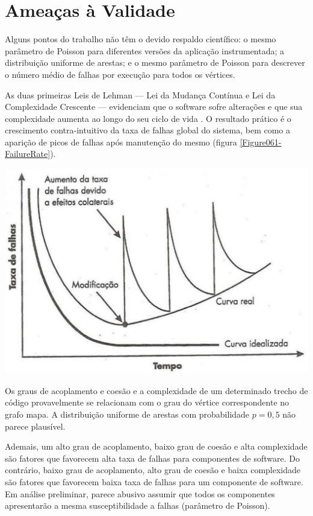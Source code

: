 
\section{Ameaças à Validade}

Alguns pontos do trabalho não têm o devido respaldo científico: o mesmo
parâmetro de Poisson para diferentes versões da aplicação instrumentada; a
distribuição uniforme de arestas; e o mesmo parâmetro de Poisson para descrever
o número médio de falhas por execução para todos os vértices.

As duas primeiras Leis de Lehman --- Lei da Mudança Contínua e Lei da
Complexidade Crescente --- evidenciam que o software sofre alterações e que sua
complexidade aumenta ao longo do seu ciclo de vida \cite{Wazlawick2013}. O
resultado prático é o crescimento contra-intuitivo da taxa de falhas global do
sistema, bem como a aparição de picos de falhas após manutenção do mesmo
(figura \ref{Figure061-FailureRate}).

\hfill \break
{
  \centering
  \captionsetup{type=figure}
	\includegraphics[scale=0.1625]{./figures/Figure061-FailureRate.pdf}
  \hfill
	\label{Figure061-FailureRate}
}

Os graus de acoplamento e coesão e a complexidade de um determinado trecho de
código provavelmente se relacionam com o grau do vértice correspondente no grafo
mapa. A distribuição uniforme de arestas com probabilidade $p=0,5$ não parece
plausível.

Ademais, um alto grau de acoplamento, baixo grau de coesão e alta complexidade
são fatores que favorecem alta taxa de falhas para componentes de software. Do
contrário, baixo grau de acoplamento, alto grau de coesão e baixa complexidade
são fatores que favorecem baixa taxa de falhas para um componente de software.
Em análise preliminar, parece abusivo assumir que todos os componentes
apresentarão a mesma susceptibilidade a falhas (parâmetro de Poisson).
